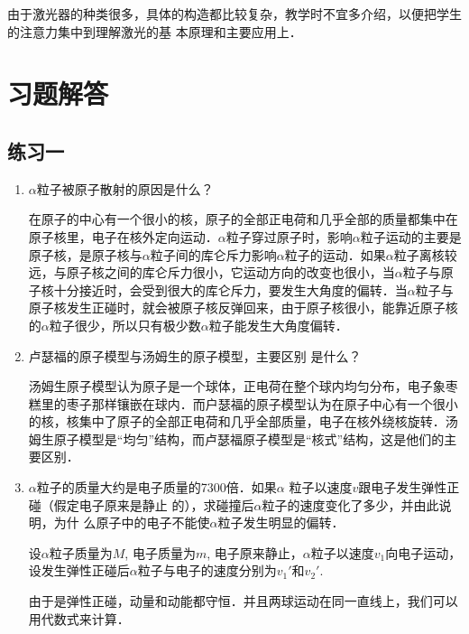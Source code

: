由于激光器的种类很多，具体的构造都比较复杂，教学时不宜多介绍，以便把学生的注意力集中到理解激光的基
本原理和主要应用上．

\section{习题解答}

\subsection{练习一}
\begin{enumerate}
    \item $\alpha$粒子被原子散射的原因是什么？

\begin{solution}
在原子的中心有一个很小的核，原子的全部正电荷和几乎全部的质量都集中在原子核里，电子在核外定向运动．$\alpha$粒子穿过原子时，影响$\alpha$粒子运动的主要是原子核，是原子核与$\alpha$粒子间的库仑斥力影响$\alpha$粒子的运动．如果$\alpha$粒子离核较远，与原子核之间的库仑斥力很小，它运动方向的改变也很小，当$\alpha$粒子与原子核十分接近时，会受到很大的库仑斥力，要发生大角度的偏转．当$\alpha$粒子与原子核发生正碰时，就会被原子核反弹回来，由于原子核很小，能靠近原子核的$\alpha$粒子很少，所以只有极少数$\alpha$粒子能发生大角度偏转．    
\end{solution}
    \item 卢瑟福的原子模型与汤姆生的原子模型，主要区别
    是什么？

    \begin{solution}
汤姆生原子模型认为原子是一个球体，正电荷在整个球内均匀分布，电子象枣糕里的枣子那样镶嵌在球内．而户瑟福的原子模型认为在原子中心有一个很小的核，核集中了原子的全部正电荷和几乎全部质量，电子在核外绕核旋转．汤姆生原子模型是“均匀”结构，而卢瑟福原子模型是“核式”结构，这是他们的主要区别．        
    \end{solution}
    \item $\alpha$粒子的质量大约是电子质量的7300倍．如果$\alpha$
    粒子以速度$v$跟电子发生弹性正碰（假定电子原来是静止
    的），求碰撞后$\alpha$粒子的速度变化了多少，并由此说明，为什
    么原子中的电子不能使$\alpha$粒子发生明显的偏转．

    \begin{solution}
设$\alpha$粒子质量为$M$, 电子质量为$m$, 电子原来静止，$\alpha$粒子以速度$v_1$向电子运动，设发生弹性正碰后$\alpha$粒子与电子的速度分别为$v_1'$和$v_2'$.

由于是弹性正碰，动量和动能都守恒．并且两球运动在同一直线上，我们可以用代数式来计算．


\end{solution}
\end{enumerate}
